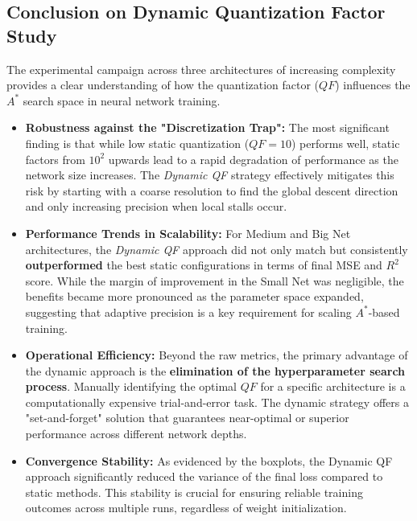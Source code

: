 \newpage

\subsection{Conclusion on Dynamic Quantization Factor Study}

The experimental campaign across three architectures of increasing complexity provides a clear understanding of how the quantization factor ($QF$) influences the $A^*$ search space in neural network training.

\begin{itemize}
    \item \textbf{Robustness against the "Discretization Trap":} The most significant finding is that while low static quantization ($QF=10$) performs well, static factors from $10^2$ upwards lead to a rapid degradation of performance as the network size increases. The \textit{Dynamic QF} strategy effectively mitigates this risk by starting with a coarse resolution to find the global descent direction and only increasing precision when local stalls occur.
    
    \item \textbf{Performance Trends in Scalability:} For Medium and Big Net architectures, the \textit{Dynamic QF} approach did not only match but consistently \textbf{outperformed} the best static configurations in terms of final MSE and $R^2$ score. While the margin of improvement in the Small Net was negligible, the benefits became more pronounced as the parameter space expanded, suggesting that adaptive precision is a key requirement for scaling $A^*$-based training.
    
    \item \textbf{Operational Efficiency:} Beyond the raw metrics, the primary advantage of the dynamic approach is the \textbf{elimination of the hyperparameter search process}. Manually identifying the optimal $QF$ for a specific architecture is a computationally expensive trial-and-error task. The dynamic strategy offers a "set-and-forget" solution that guarantees near-optimal or superior performance across different network depths.
    
    \item \textbf{Convergence Stability:} As evidenced by the boxplots, the Dynamic QF approach significantly reduced the variance of the final loss compared to static methods. This stability is crucial for ensuring reliable training outcomes across multiple runs, regardless of weight initialization.
\end{itemize}

